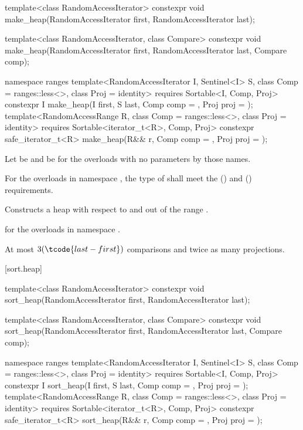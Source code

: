 %
\begin{itemdecl}
template<class RandomAccessIterator>
  constexpr void make_heap(RandomAccessIterator first, RandomAccessIterator last);

template<class RandomAccessIterator, class Compare>
  constexpr void make_heap(RandomAccessIterator first, RandomAccessIterator last,
                           Compare comp);

namespace ranges {
  template<RandomAccessIterator I, Sentinel<I> S, class Comp = ranges::less<>,
           class Proj = identity>
    requires Sortable<I, Comp, Proj>
    constexpr I
      make_heap(I first, S last, Comp comp = {}, Proj proj = {});
  template<RandomAccessRange R, class Comp = ranges::less<>, class Proj = identity>
    requires Sortable<iterator_t<R>, Comp, Proj>
    constexpr safe_iterator_t<R>
      make_heap(R&& r, Comp comp = {}, Proj proj = {});
}
\end{itemdecl}

\begin{itemdescr}
\pnum
Let  be 
and  be 
for the overloads with no parameters by those names.

\pnum
\requires
For the overloads in namespace ,
the type of  shall meet
the  () and
 () requirements.

\pnum
\effects
Constructs a heap with respect to  and 
out of the range .

\pnum
\returns
{} for the overloads in namespace .

\pnum
\complexity
At most $3(\tcode{last - first})$ comparisons and twice as many projections.
\end{itemdescr}

[sort.heap]{}

%
\begin{itemdecl}
template<class RandomAccessIterator>
  constexpr void sort_heap(RandomAccessIterator first, RandomAccessIterator last);

template<class RandomAccessIterator, class Compare>
  constexpr void sort_heap(RandomAccessIterator first, RandomAccessIterator last,
                           Compare comp);

namespace ranges {
  template<RandomAccessIterator I, Sentinel<I> S, class Comp = ranges::less<>,
           class Proj = identity>
    requires Sortable<I, Comp, Proj>
    constexpr I
      sort_heap(I first, S last, Comp comp = {}, Proj proj = {});
  template<RandomAccessRange R, class Comp = ranges::less<>, class Proj = identity>
    requires Sortable<iterator_t<R>, Comp, Proj>
    constexpr safe_iterator_t<R>
      sort_heap(R&& r, Comp comp = {}, Proj proj = {});
}
\end{itemdecl}

